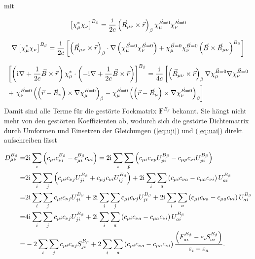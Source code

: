 mit

\begin{equation}
\left[\chi_\mu^*\chi_\nu\right]^{B_\beta}=\frac{\mathrm{i}\mkern1mu}{2c}\left(\vec{R}_{\mu\nu}\times\vec{r}\right)_\beta\chi_\mu^{\vec{B}=0}\chi_\nu^{\vec{B}=0}
\end{equation}

\begin{equation}
\nabla \left[\chi_\mu^*\chi_\nu\right]^{B_\beta}=\frac{\mathrm{i}\mkern1mu}{2c}\left[\left(\vec{R}_{\mu\nu}\times\vec{r}\right)_\beta\cdot\nabla\left(\chi_\mu^{\vec{B}=0}\chi_\nu^{\vec{B}=0}\right)+\chi_\mu^{\vec{B}=0}\chi_\nu^{\vec{B}=0}\left(\vec{B}\times\vec{R}_{\mu\nu}\right)^{B_\beta}\right]
\end{equation}

\begin{equation}\label{eq:mggadb}
\begin{aligned}
&\left[\left(\mathrm{i}\mkern1mu\nabla +\frac{1}{2c}\vec{B}\times\vec{r}\right)\chi_\mu^*\cdot\left(-\mathrm{i}\mkern1mu\nabla+\frac{1}{2c}\vec{B}\times\vec{r}\right)\right]
^{B_\beta}=\frac{\mathrm{i}\mkern1mu}{4c}\left[\left(\vec{R}_{\mu\nu}\times\vec{r}\right)_\beta\nabla\chi_{\mu}^{\vec{B}=0}\nabla\chi_{\nu}^{\vec{B}=0}\right.\\
&+\left.\chi_{\nu}^{\vec{B}=0}\left(\left(\vec{r}-\vec{R}_\nu\right)\times\nabla\chi_{\mu}^{\vec{B}=0}\right)_\beta-\chi_{\mu}^{\vec{B}=0}\left(\left(\vec{r}-\vec{R}_\mu\right)\times\nabla\chi_{\nu}^{\vec{B}=0}\right)_\beta\right]
\end{aligned}
\end{equation}
Damit sind alle Terme  für die gestörte Fockmatrix $\boldsymbol{F}^{B_\beta}$ bekannt. Sie hängt nicht mehr von den gestörten Koeffizienten ab, wodurch sich die gestörte Dichtematrix durch Umformen und Einsetzen der Gleichungen (\ref{eq:uji}) und (\ref{eq:uai}) direkt aufschreiben lässt

\begin{equation}
\begin{aligned}
D_{\mu\nu}^{B_\beta}=&2\mathrm{i}\mkern1mu\sum_i\left(c_{\mu i}c_{\nu i}^{B_\beta}-c_{\mu i}^{B_\beta}c_{\nu i}\right)=2\mathrm{i}\mkern1mu\sum_i\sum_p\left(c_{\mu i}c_{\nu p} U_{pi}^{B_\beta}-c_{\mu p}c_{\nu i}U_{pi}^{B_\beta}\right)\\
=&2\mathrm{i}\mkern1mu\sum_i\sum_j \left(c_{\mu i}c_{\nu j} U_{ji}^{B_\beta}+c_{\mu j}c_{\nu i}U_{ij}^{B_\beta}\right) +2\mathrm{i}\mkern1mu\sum_i\sum_a\left(c_{\mu i}c_{\nu a}-c_{\mu a}c_{\nu i}\right)U_{ai}^{B_\beta}\\
=&2\mathrm{i}\mkern1mu\sum_i\sum_j c_{\mu i}c_{\nu j} U_{ji}^{B_\beta}+2\mathrm{i}\mkern1mu\sum_i\sum_j c_{\mu i}c_{\nu j}U_{ji}^{B_\beta}+2\mathrm{i}\mkern1mu\sum_i\sum_a\left(c_{\mu i}c_{\nu a}-c_{\mu a}c_{\nu i}\right)U_{ai}^{B_\beta}\\
=&4\mathrm{i}\mkern1mu\sum_i\sum_j c_{\mu i}c_{\nu j} U_{ji}^{B_\beta}+2\mathrm{i}\mkern1mu\sum_i\sum_a\left(c_{\mu i}c_{\nu a}-c_{\mu a}c_{\nu i}\right)U_{ai}^{B_\beta}\\
=&-2\sum_i\sum_j c_{\mu i}c_{\nu j} S_{ji}^{B_\beta}+2\sum_i\sum_a\left(c_{\mu i}c_{\nu a}-c_{\mu a}c_{\nu i}\right)\frac{\left(F_{ai}^{B_\beta}-\varepsilon_i S_{ai}^{B_\beta}\right)}{\varepsilon_i-\varepsilon_a}.
\end{aligned}
\end{equation}

